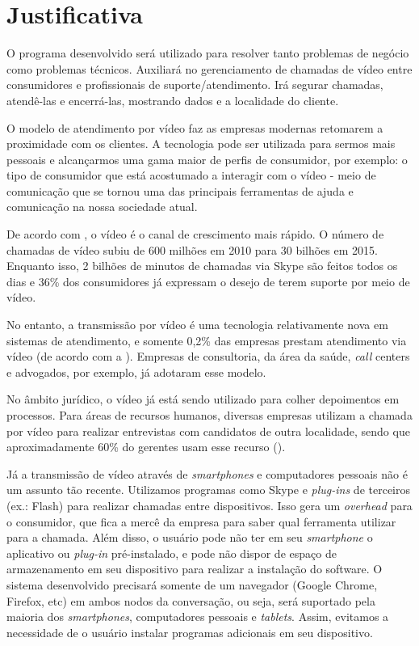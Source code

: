 \section{Justificativa}
O programa desenvolvido será utilizado para resolver tanto problemas de negócio como problemas técnicos. Auxiliará no gerenciamento de chamadas de vídeo entre consumidores e profissionais de suporte/atendimento. Irá segurar chamadas, atendê-las e encerrá-las, mostrando dados e a localidade do cliente.

O modelo de atendimento por vídeo faz as empresas modernas retomarem a proximidade com os clientes. A tecnologia pode ser utilizada para sermos mais pessoais e alcançarmos uma gama maior de perfis de consumidor, por exemplo: o tipo de consumidor que está acostumado a interagir com o vídeo - meio de comunicação que se tornou uma das principais ferramentas de ajuda e comunicação na nossa sociedade atual. 

De acordo com \cite{customericare2015}, o vídeo é o canal de crescimento mais rápido. O número de chamadas de vídeo subiu de 600 milhões em 2010 para 30 bilhões em 2015. Enquanto isso, 2 bilhões de minutos de chamadas via Skype são feitos todos os dias e 36\% dos consumidores já expressam o desejo de terem suporte por meio de vídeo.

No entanto, a transmissão por vídeo é uma tecnologia relativamente nova em sistemas de atendimento, e somente 0,2\% das empresas prestam atendimento via vídeo (de acordo com a \cite{contactcentredoing2014}). 
Empresas de consultoria, da área da saúde, \textit{call} centers e advogados, por exemplo, já adotaram esse modelo. 

No âmbito jurídico, o vídeo já está sendo utilizado para colher depoimentos em processos. Para áreas de recursos humanos, diversas empresas utilizam a chamada por vídeo para realizar entrevistas com candidatos de outra localidade, sendo que aproximadamente 60\% do gerentes usam esse recurso (\cite{videochatinfographic2013}).

Já a transmissão de vídeo através de \textit{smartphones} e computadores pessoais não é um assunto tão recente. Utilizamos programas como Skype e \textit{plug-ins} de terceiros (ex.: Flash) para realizar chamadas entre dispositivos. Isso gera um \textit{overhead} para o consumidor, que fica a mercê da empresa para saber qual ferramenta utilizar para a chamada. Além disso, o usuário pode não ter em seu \textit{smartphone} o aplicativo ou \textit{plug-in} pré-instalado, e pode não dispor de espaço de armazenamento em seu dispositivo para realizar a instalação do software. O sistema desenvolvido precisará somente de um navegador (Google Chrome, Firefox, etc) em ambos nodos da conversação, ou seja, será suportado pela maioria dos \textit{smartphones}, computadores pessoais e \textit{tablets}. Assim, evitamos a necessidade de o usuário instalar programas adicionais em seu dispositivo.

